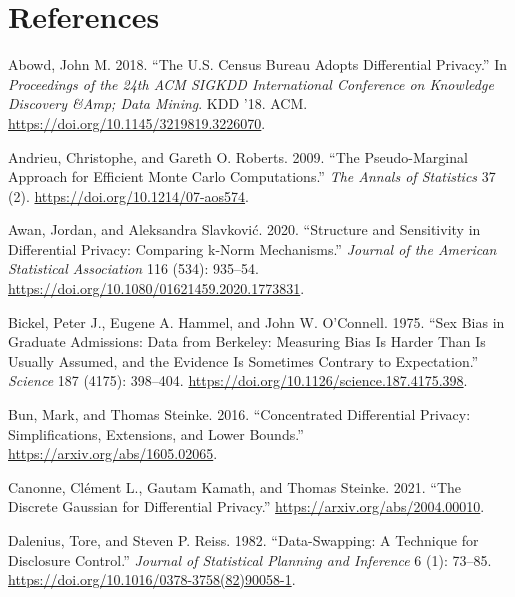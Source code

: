 \hypertarget{references}{%
\section*{References}\label{references}}

\hypertarget{refs}{}
\begin{CSLReferences}{1}{0}
\leavevmode{}%
Abowd, John M. 2018. {``The {U}.{S}. Census {B}ureau Adopts Differential Privacy.''} In \emph{Proceedings of the 24th ACM SIGKDD International Conference on Knowledge Discovery \&Amp; Data Mining}. KDD '18. ACM. \url{https://doi.org/10.1145/3219819.3226070}.

\leavevmode{}%
Andrieu, Christophe, and Gareth O. Roberts. 2009. {``The Pseudo-Marginal Approach for Efficient Monte Carlo Computations.''} \emph{The Annals of Statistics} 37 (2). \url{https://doi.org/10.1214/07-aos574}.

\leavevmode{}%
Awan, Jordan, and Aleksandra Slavković. 2020. {``Structure and Sensitivity in Differential Privacy: Comparing k-Norm Mechanisms.''} \emph{Journal of the American Statistical Association} 116 (534): 935--54. \url{https://doi.org/10.1080/01621459.2020.1773831}.

\leavevmode{}%
Bickel, Peter J., Eugene A. Hammel, and John W. O'Connell. 1975. {``Sex Bias in Graduate Admissions: Data from Berkeley: Measuring Bias Is Harder Than Is Usually Assumed, and the Evidence Is Sometimes Contrary to Expectation.''} \emph{Science} 187 (4175): 398--404. \url{https://doi.org/10.1126/science.187.4175.398}.

\leavevmode{}%
Bun, Mark, and Thomas Steinke. 2016. {``Concentrated Differential Privacy: Simplifications, Extensions, and Lower Bounds.''} \url{https://arxiv.org/abs/1605.02065}.

\leavevmode{}%
Canonne, Clément L., Gautam Kamath, and Thomas Steinke. 2021. {``The Discrete Gaussian for Differential Privacy.''} \url{https://arxiv.org/abs/2004.00010}.

\leavevmode{}%
Dalenius, Tore, and Steven P. Reiss. 1982. {``Data-Swapping: A Technique for Disclosure Control.''} \emph{Journal of Statistical Planning and Inference} 6 (1): 73--85. \url{https://doi.org/10.1016/0378-3758(82)90058-1}.


\end{CSLReferences}
